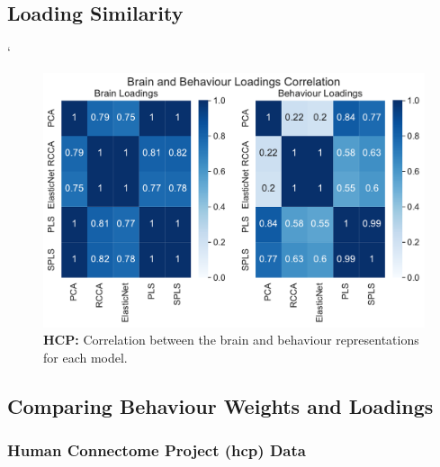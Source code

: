 \subsection{Loading Similarity}

`\begin{figure}
     \centering
     \includegraphics[width=0.8\linewidth]{figures/hcp/brain and behaviour loadings correlation}
     \caption{\textbf{HCP:} Correlation between the brain and behaviour \gls{representations} for each model.}\label{fig:brain-behaviour-scores-sim}
\end{figure}

\subsection{Comparing Behaviour Weights and Loadings}

\subsubsection{Human Connectome Project (\acrshort{hcp}) Data}

